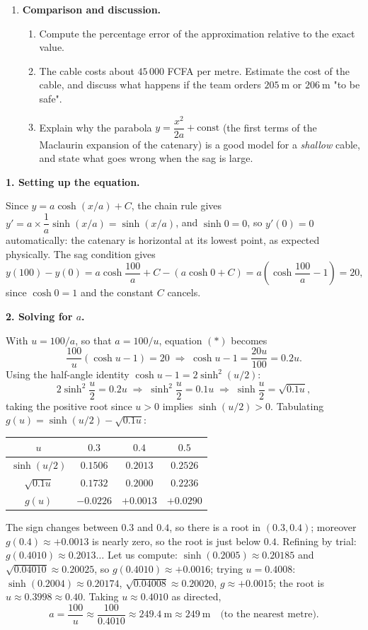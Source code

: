 \documentclass[11pt]{article}
\newcounter{popsec}
\newcounter{popsub}
\newcommand{\courssub}[1]{%
  \stepcounter{popsub}%
  \par\vspace{9pt}\noindent{\popxbold\fontsize{11.5}{13}\selectfont\color{popink}{\color{poporange}\thepopsec.\thepopsub}\hspace{6pt}#1}\par\nopagebreak\vspace{4pt}
}
\begin{document}
\begin{enumerate}
\item \textbf{Comparison and discussion.}
\begin{enumerate}
\item Compute the percentage error of the approximation relative to the exact value.
\item The cable costs about $45\,000$ FCFA per metre. Estimate the cost of the cable, and discuss what happens if the team orders $205\ \mathrm{m}$ or $206\ \mathrm{m}$ "to be safe".
\item Explain why the parabola $y = \dfrac{x^2}{2a} + \text{const}$ (the first terms of the Maclaurin expansion of the catenary) is a good model for a \emph{shallow} cable, and state what goes wrong when the sag is large.
\end{enumerate}
\end{enumerate}

\courssub{Model answer}

\textbf{1. Setting up the equation.}

Since $y = a\cosh(x/a) + C$, the chain rule gives $y' = a \times \dfrac{1}{a}\sinh(x/a) = \sinh(x/a)$, and $\sinh 0 = 0$, so $y'(0) = 0$ automatically: the catenary is horizontal at its lowest point, as expected physically. The sag condition gives
\[ y(100) - y(0) = a\cosh\frac{100}{a} + C - \left(a\cosh 0 + C\right) = a\left(\cosh\frac{100}{a} - 1\right) = 20, \]
since $\cosh 0 = 1$ and the constant $C$ cancels.

\textbf{2. Solving for $a$.}

With $u = 100/a$, so that $a = 100/u$, equation $(\ast)$ becomes
\[ \frac{100}{u}\left(\cosh u - 1\right) = 20 \;\Longrightarrow\; \cosh u - 1 = \frac{20u}{100} = 0.2u. \]
Using the half-angle identity $\cosh u - 1 = 2\sinh^2(u/2)$:
\[ 2\sinh^2\frac{u}{2} = 0.2u \;\Longrightarrow\; \sinh^2\frac{u}{2} = 0.1u \;\Longrightarrow\; \sinh\frac{u}{2} = \sqrt{0.1u}, \]
taking the positive root since $u > 0$ implies $\sinh(u/2) > 0$. Tabulating $g(u) = \sinh(u/2) - \sqrt{0.1u}$:
\begin{center}
\begin{tabular}{|c|c|c|c|}
\hline
\rowcolor{popblueL} $u$ & $0.3$ & $0.4$ & $0.5$ \\ \hline
$\sinh(u/2)$ & $0.1506$ & $0.2013$ & $0.2526$ \\ \hline
$\sqrt{0.1u}$ & $0.1732$ & $0.2000$ & $0.2236$ \\ \hline
$g(u)$ & $-0.0226$ & $+0.0013$ & $+0.0290$ \\ \hline
\end{tabular}
\end{center}
The sign changes between $0.3$ and $0.4$, so there is a root in $(0.3, 0.4)$; moreover $g(0.4) \approx +0.0013$ is nearly zero, so the root is just below $0.4$. Refining by trial: $g(0.4010) \approx 0.2013\ldots$ Let us compute: $\sinh(0.2005) \approx 0.20185$ and $\sqrt{0.04010} \approx 0.20025$, so $g(0.4010) \approx +0.0016$; trying $u = 0.4008$: $\sinh(0.2004)\approx 0.20174$, $\sqrt{0.04008}\approx 0.20020$, $g \approx +0.0015$; the root is $u \approx 0.3998 \approx 0.40$. Taking $u \approx 0.4010$ as directed,
\[ a = \frac{100}{u} \approx \frac{100}{0.4010} \approx 249.4\ \mathrm{m} \approx 249\ \mathrm{m} \quad\text{(to the nearest metre)}. \]
\end{document}

